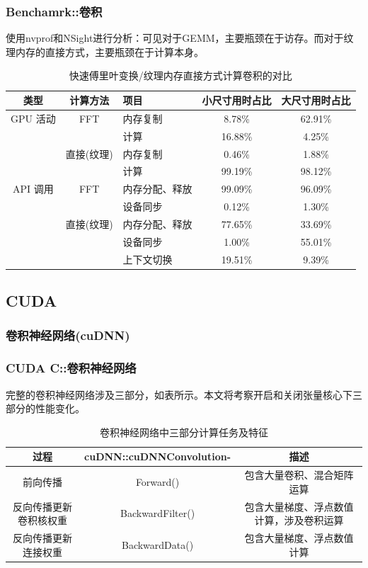 \documentclass[10pt,aspectratio=169,mathserif]{beamer}
\begin{document}
	\begin{frame}
		\frametitle{Benchamrk::卷积}
		使用nvprof和NSight进行分析：可见对于GEMM，主要瓶颈在于访存。而对于纹理内存的直接方式，主要瓶颈在于计算本身。
		\begin{table}
			\centering
			\caption{快速傅里叶变换/纹理内存直接方式计算卷积的对比}
			\begin{tabular}{cclcc}
				\toprule
				类型 & 计算方法 & 项目 & 小尺寸用时占比 & 大尺寸用时占比\\
				\midrule
				GPU 活动& FFT & 内存复制 & 8.78\% & 62.91\%\\
				&				&  计算 & 16.88\% & 4.25\%\\
				& 直接(纹理)&  内存复制 & 0.46\% & 1.88\%\\
				&				&  计算 & 99.19\% & 98.12\%\\
				\midrule
				API 调用 &FFT &内存分配、释放 &99.09\% & 96.09\% \\
				&				& 设备同步 &0.12\% & 1.30\%\\
				&直接(纹理)& 内存分配、释放 & 77.65\% & 33.69\%\\
				&				& 设备同步 & 1.00\% & 55.01\% \\
				&			    & 上下文切换 & 19.51\% & 9.39\%\\
				\bottomrule
			\end{tabular} \label{table-CONVPROF} 
		\end{table}
	\end{frame}
	\subsection{CUDA}
	\subsubsection{卷积神经网络(cuDNN)}
	\begin{frame}
		\frametitle{CUDA C::卷积神经网络}
		完整的卷积神经网络涉及三部分，如表所示。本文将考察开启和关闭张量核心下三部分的性能变化。
		\begin{table}
			\centering
			\caption{卷积神经网络中三部分计算任务及特征}
			\begin{tabular}{ccc}
				\toprule
				过程 & cuDNN::cuDNNConvolution-	&	描述\\
				\midrule
				前向传播 & Forward() & 包含大量卷积、混合矩阵运算 \\
				反向传播更新卷积核权重 & BackwardFilter() & 包含大量梯度、浮点数值计算，涉及卷积运算\\
				反向传播更新连接权重 & BackwardData() & 包含大量梯度、浮点数值计算\\
				\bottomrule
			\end{tabular} 
		\end{table}
	\end{frame}
\end{document}
